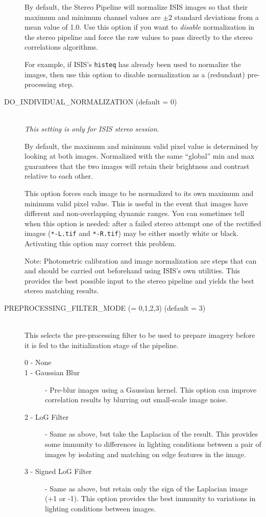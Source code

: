 \begin{description}
  By default, the Stereo Pipeline will normalize ISIS images so that
  their maximum and minimum channel values are $\pm$2 standard
  deviations from a mean value of 1.0.  Use this option if you want to
  {\em disable} normalization in the stereo pipeline and force the raw
  values to pass directly to the stereo correlations algorithms.

  For example, if ISIS's \texttt{histeq} has already been used to
  normalize the images, then use this option to disable normalization
  as a (redundant) pre-processing step.


\item[DO\_INDIVIDUAL\_NORMALIZATION \textnormal (default = 0)] \hfill \\
  \emph{This setting is only for ISIS stereo session.}

  By default, the maximum and minimum valid pixel value is determined
  by looking at both images.  Normalized with the same ``global'' min
  and max guarantees that the two images will retain their brightness
  and contrast relative to each other.

  This option forces each image to be normalized to its own maximum
  and minimum valid pixel value. This is useful in the event that
  images have different and non-overlapping dynamic ranges. You can
  sometimes tell when this option is needed: after a failed stereo
  attempt one of the rectified images (\texttt{*-L.tif} and
  \texttt{*-R.tif}) may be either mostly white or black.  Activating
  this option may correct this problem.

  Note: Photometric calibration and image normalization are steps that
  can and should be carried out beforehand using ISIS's own utilities.
  This provides the best possible input to the stereo pipeline and
  yields the best stereo matching results.

\item[PREPROCESSING\_FILTER\_MODE \textnormal{\small{(= 0,1,2,3)}} (default = 3)] \hfill \\
  This selects the pre-processing filter to be used to prepare imagery
  before it is fed to the initialization stage of the pipeline.

  \begin{description}
    \item[0 - None]
    \item[1 - Gaussian Blur] - Pre-blur images using a Gaussian
      kernel.  This option can improve correlation results by blurring
      out small-scale image noise.
    \item[2 - LoG Filter] - Same as above, but take the Laplacian of
      the result.  This provides some immunity to differences in
      lighting conditions between a pair of images by isolating and
      matching on edge features in the image.
    \item[3 - Signed LoG Filter] - Same as above, but retain only the
      sign of the Laplacian image (+1 or -1).  This option provides
      the best immunity to variations in lighting conditions between
      images.
  \end{description}


\end{description}
